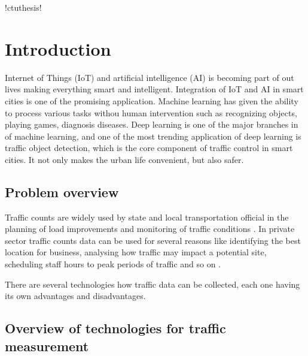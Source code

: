 \documentclass[twoside]{ctuthesis}
\theoremstyle{plain}
\theoremstyle{definition}
\theoremstyle{note}
\begin{document}
\renewcommand \ctulstsep {0pt}
\newcommand\ctuclsname{\leavevmode\unhcopy\ctuclsnamebox}
\newsavebox\ctuclsnamebox
\begin{lrbox}{\ctuclsnamebox}
\ctulst!ctuthesis!
\end{lrbox}
\maketitle
\chapter{Introduction}

Internet of Things (IoT) and artificial intelligence (AI) is becoming part of out lives making everything smart and intelligent. Integration of IoT and AI in smart cities is one of the promising application\cite{sushma_nagaraj}. 
Machine learning has given the ability to process various tasks withou human intervention such as recognizing objects, playing games, diagnosis diseases. Deep learning is one of the major branches in of machine learning, and one of the most trending application of deep learning is traffic object detection, which is the core component of traffic control in smart cities. It not only makes the urban life convenient, but also safer.


\section{Problem overview}

Traffic counts are widely used by state and local transportation official in the planning of load improvements and monitoring of traffic conditions \cite{traffic_counts}. In private sector traffic counts data can be used for several reasons like identifying the best location for business, analysing how traffic may impact a potential site, scheduling staff hours to peak periods of traffic and so on \cite{arcgis}.

 There are several technologies how traffic data can be collected, each one having its own advantages and disadvantages.

\section{Overview of technologies for traffic measurement}
\end{document}
